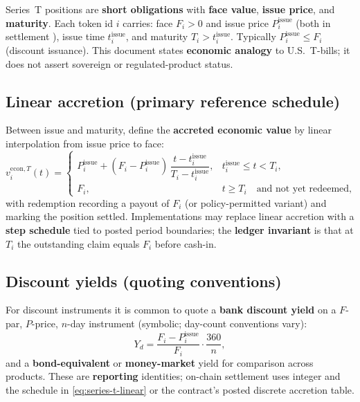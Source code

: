 \documentclass[11pt,a4paper]{article}
\newcommand{\minor}{\text{minor units}}
\begin{document}
Series~T positions are \textbf{short obligations} with \textbf{face value}, \textbf{issue price}, and \textbf{maturity}. Each token id $i$ carries: face $F_i > 0$ and issue price $P^{\mathrm{issue}}_i$ (both in settlement \minor), issue time $t^{\mathrm{issue}}_i$, and maturity $T_i > t^{\mathrm{issue}}_i$. Typically $P^{\mathrm{issue}}_i \le F_i$ (discount issuance). This document states \textbf{economic analogy} to U.S.\ T-bills; it does not assert sovereign or regulated-product status.

\subsection{Linear accretion (primary reference schedule)}

Between issue and maturity, define the \textbf{accreted economic value} by linear interpolation from issue price to face:
\begin{equation}
\label{eq:series-t-linear}
v_i^{\mathrm{econ},T}(t) =
\begin{cases}
P^{\mathrm{issue}}_i
+ (F_i - P^{\mathrm{issue}}_i)\,
\dfrac{t - t^{\mathrm{issue}}_i}{T_i - t^{\mathrm{issue}}_i},
& t^{\mathrm{issue}}_i \le t < T_i, \\[0.8em]
F_i, & t \ge T_i \quad \text{and not yet redeemed,}
\end{cases}
\end{equation}
with redemption recording a payout of $F_i$ (or policy-permitted variant) and marking the position settled. Implementations may replace linear accretion with a \textbf{step schedule} tied to posted period boundaries; the \textbf{ledger invariant} is that at $T_i$ the outstanding claim equals $F_i$ before cash-in.

\subsection{Discount yields (quoting conventions)}

For discount instruments it is common to quote a \textbf{bank discount yield} on a $F$-par, $P$-price, $n$-day instrument (symbolic; day-count conventions vary):
\begin{equation}
\label{eq:bank-discount}
Y_d = \frac{F_i - P^{\mathrm{issue}}_i}{F_i} \cdot \frac{360}{n},
\end{equation}
and a \textbf{bond-equivalent} or \textbf{money-market} yield for comparison across products. These are \textbf{reporting} identities; on-chain settlement uses integer \minor{} and the schedule in \eqref{eq:series-t-linear} or the contract's posted discrete accretion table.
\end{document}
